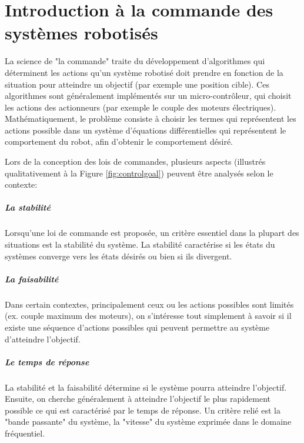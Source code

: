 \chapter{Introduction à la commande des systèmes robotisés}
\label{sec:introcommanderobots}

La science de "la commande" traite du développement d'algorithmes qui déterminent les actions qu'un système robotisé doit prendre en fonction de la situation pour atteindre un objectif (par exemple une position cible). Ces algorithmes sont généralement implémentés sur un micro-contrôleur, qui choisit les actions des actionneurs (par exemple le couple des moteurs électriques). Mathématiquement, le problème consiste à choisir les termes qui représentent les actions possible dans un système d'équations différentielles qui représentent le comportement du robot, afin d'obtenir le comportement désiré.

Lors de la conception des lois de commandes, plusieurs aspects (illustrés qualitativement à la Figure \ref{fig:controlgoal}) peuvent être analysés selon le contexte: 

\paragraph{La stabilité} 

Lorsqu'une loi de commande est proposée, un critère essentiel dans la plupart des situations est la stabilité du système. La stabilité caractérise si les états du systèmes converge vers les états désirés ou bien si ils divergent. 

\paragraph{La faisabilité} 

Dans certain contextes, principalement ceux ou les actions possibles sont limités (ex. couple maximum des moteurs), on s'intéresse tout simplement à savoir si il existe une séquence d'actions possibles qui peuvent permettre au système d'atteindre l'objectif. 

\paragraph{Le temps de réponse} 

La stabilité et la faisabilité détermine si le système pourra atteindre l'objectif. Ensuite, on cherche généralement à atteindre l'objectif le plus rapidement possible ce qui est caractérisé par le temps de réponse. Un critère relié est la "bande passante" du système, la "vitesse" du système exprimée dans le domaine fréquentiel.

